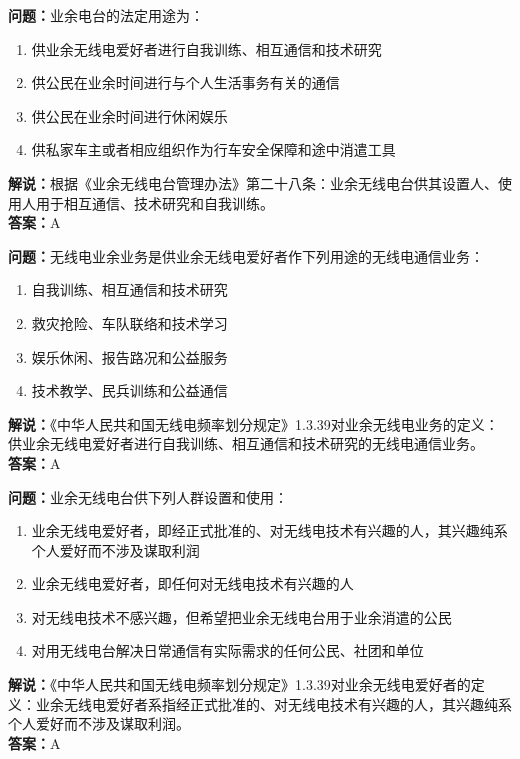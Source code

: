 \documentclass[UTF8]{ctexbook}
\begin{document}
\textbf{问题：}业余电台的法定用途为：
\begin{enumerate}[label=\Alph*), leftmargin=3em]
  \item 供业余无线电爱好者进行自我训练、相互通信和技术研究
  \item 供公民在业余时间进行与个人生活事务有关的通信
  \item 供公民在业余时间进行休闲娱乐
  \item 供私家车主或者相应组织作为行车安全保障和途中消遣工具
\end{enumerate}
\textbf{解说：}根据《业余无线电台管理办法》第二十八条：业余无线电台供其设置人、使用人用于相互通信、技术研究和自我训练。\\
\textbf{答案：}A

\textbf{问题：}无线电业余业务是供业余无线电爱好者作下列用途的无线电通信业务：
\begin{enumerate}[label=\Alph*), leftmargin=3em]
  \item 自我训练、相互通信和技术研究
  \item 救灾抢险、车队联络和技术学习
  \item 娱乐休闲、报告路况和公益服务
  \item 技术教学、民兵训练和公益通信
\end{enumerate}
\textbf{解说：}《中华人民共和国无线电频率划分规定》1.3.39对业余无线电业务的定义：供业余无线电爱好者进行自我训练、相互通信和技术研究的无线电通信业务。\\
\textbf{答案：}A

\textbf{问题：}业余无线电台供下列人群设置和使用：
\begin{enumerate}[label=\Alph*), leftmargin=3em]
  \item 业余无线电爱好者，即经正式批准的、对无线电技术有兴趣的人，其兴趣纯系个人爱好而不涉及谋取利润
  \item 业余无线电爱好者，即任何对无线电技术有兴趣的人
  \item 对无线电技术不感兴趣，但希望把业余无线电台用于业余消遣的公民
  \item 对用无线电台解决日常通信有实际需求的任何公民、社团和单位
\end{enumerate}
\textbf{解说：}《中华人民共和国无线电频率划分规定》1.3.39对业余无线电爱好者的定义：业余无线电爱好者系指经正式批准的、对无线电技术有兴趣的人，其兴趣纯系个人爱好而不涉及谋取利润。\\
\textbf{答案：}A
\end{document}
